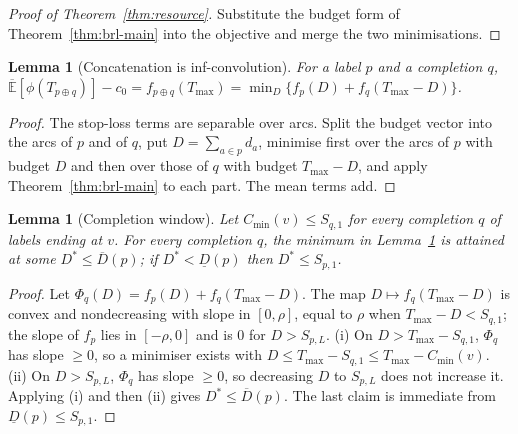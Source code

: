 \documentclass[preprint,12pt]{elsarticle}
\newtheorem{lemma}[theorem]{Lemma}
\theoremstyle{definition}
\theoremstyle{remark}
\newcommand{\Eu}{\overline{\mathbb{E}}}
\newcommand{\Dl}{\underline{D}}
\newcommand{\Dh}{\overline{D}}
\begin{document}
\begin{proof}[Proof of Theorem~\ref{thm:resource}]
Substitute the budget form of Theorem~\ref{thm:brl-main} into the objective and merge the two minimisations.
\end{proof}

\begin{lemma}[Concatenation is inf-convolution]\label{lem:infconv}
For a label $p$ and a completion $q$, $\Eu[\phi(T_{p\oplus q})]-c_0=f_{p\oplus q}(T_{\max})=\min_D\{f_p(D)+f_q(T_{\max}-D)\}$.
\end{lemma}
\begin{proof}
The stop-loss terms are separable over arcs. Split the budget vector into the arcs of $p$ and of $q$, put $D=\sum_{a\in p}d_a$, minimise first over the arcs of $p$ with budget $D$ and then over those of $q$ with budget $T_{\max}-D$, and apply Theorem~\ref{thm:brl-main} to each part. The mean terms add.
\end{proof}

\begin{lemma}[Completion window]\label{lem:window}
Let $C_{\min}(v)\le S_{q,1}$ for every completion $q$ of labels ending at $v$. For every completion $q$, the minimum in Lemma~\ref{lem:infconv} is attained at some $D^*\le\Dh(p)$; if $D^*<\Dl(p)$ then $D^*\le S_{p,1}$.
\end{lemma}
\begin{proof}
Let $\Phi_q(D)=f_p(D)+f_q(T_{\max}-D)$. The map $D\mapsto f_q(T_{\max}-D)$ is convex and nondecreasing with slope in $[0,\rho]$, equal to $\rho$ when $T_{\max}-D<S_{q,1}$; the slope of $f_p$ lies in $[-\rho,0]$ and is $0$ for $D>S_{p,L}$. (i) On $D>T_{\max}-S_{q,1}$, $\Phi_q$ has slope $\ge0$, so a minimiser exists with $D\le T_{\max}-S_{q,1}\le T_{\max}-C_{\min}(v)$. (ii) On $D>S_{p,L}$, $\Phi_q$ has slope $\ge0$, so decreasing $D$ to $S_{p,L}$ does not increase it. Applying (i) and then (ii) gives $D^*\le\Dh(p)$. The last claim is immediate from $\Dl(p)\le S_{p,1}$.
\end{proof}
\end{document}
